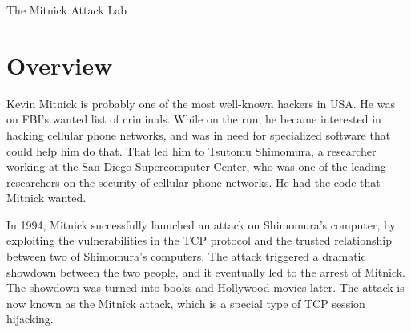 
\newcommand{\commonfolder}{../../common-files}





\newcommand{\mitnickFigs}{./Figs}

\newcommand{\rsh}{\texttt{rsh}\xspace}





\begin{center}
{\LARGE The Mitnick Attack Lab}
\end{center}



\section{Overview}

Kevin Mitnick is probably one of the most well-known hackers in USA. 
He was on FBI's wanted list of criminals. While on the run, 
he became interested in hacking cellular phone networks, and was in need for 
specialized software that could help him do that. 
That led him to Tsutomu Shimomura, a researcher working at 
the San Diego Supercomputer Center, who was
one of the leading researchers on the security of cellular phone networks.
He had the code that Mitnick wanted.

In 1994, Mitnick successfully launched an attack on Shimomura's computer,
by exploiting the vulnerabilities in the TCP protocol
and the trusted relationship between 
two of Shimomura's computers. The attack
triggered a dramatic showdown between the two people, and
it eventually led to the arrest of Mitnick. The showdown 
was turned into books and Hollywood movies later. 
The attack is now known as the Mitnick attack, which is a special type of
TCP session hijacking.


